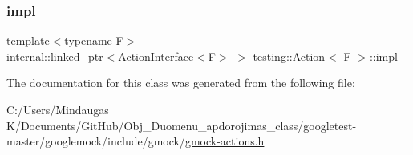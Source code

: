 \mbox{\label{classtesting_1_1_action_a878cb86f5126a22b5c6d5d8fb919f5d9}} 
\subsubsection{\texorpdfstring{impl\_}{impl\_}}
{\footnotesize\ttfamily template$<$typename F$>$ \\
\mbox{\hyperlink{classtesting_1_1internal_1_1linked__ptr}{internal\+::linked\+\_\+ptr}}$<$\mbox{\hyperlink{classtesting_1_1_action_interface}{Action\+Interface}}$<$F$>$ $>$ \mbox{\hyperlink{classtesting_1_1_action}{testing\+::\+Action}}$<$ F $>$\+::impl\+\_\+\hspace{0.3cm}{\ttfamily [private]}}



The documentation for this class was generated from the following file\+:\begin{DoxyCompactItemize}
\item 
C\+:/\+Users/\+Mindaugas K/\+Documents/\+Git\+Hub/\+Obj\+\_\+\+Duomenu\+\_\+apdorojimas\+\_\+class/googletest-\/master/googlemock/include/gmock/\mbox{\hyperlink{googletest-master_2googlemock_2include_2gmock_2gmock-actions_8h}{gmock-\/actions.\+h}}\end{DoxyCompactItemize}
